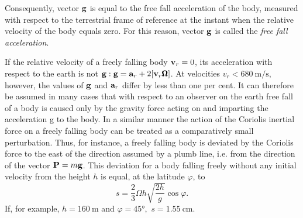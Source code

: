 Consequently, vector $\vb{g}$ is equal to the free fall acceleration of the body, measured with respect to the terrestrial frame of reference at the instant when the relative velocity of the body equals zero. For this reason, vector $\vb{g}$ is called the \emph{free fall acceleration}.

If the relative velocity of a freely falling body $\vb{v}_{r}=0$, its acceleration with respect to the earth is not $\vb{g}: \vb{g} = \vb{a}_{r}+ 2\qty[\vb{v}_{r}\pmb{\Omega}]$. At velocities $v_{r} < \SI{680}{\meter\per\second}$, however, the values of $\vb{g}$ and $\vb{a}_{r}$ differ by less than one per cent. It can therefore be assumed in many cases that with respect to an observer on the earth free fall of a body is caused only by the gravity force acting on and imparting the acceleration g to the body. In a similar manner the action of the Coriolis inertial force on a freely falling body can be treated as a comparatively small perturbation. Thus, for instance, a freely falling body is deviated by the Coriolis force to the east of the direction assumed by a plumb line, i.e. from the direction of the vector $\vb{P} = m\vb{g}$. This devia­tion for a body falling freely without any initial velocity from the height $h$ is equal, at the latitude $\varphi$, to
\begin{equation*}%
s = \frac{2}{3} \Omega h \sqrt{\dfrac{2h}{g}} \cos \varphi.
\end{equation*}
If, for example, $h = \SI{160}{\meter}$ and $\varphi = \ang{45},\,\, s = \SI{1.55}{\centi\meter}$. 

